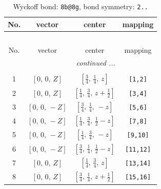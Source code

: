 \documentclass[fleqn,8pt]{jsarticle}
\begin{document}
\renewcommand{\arraystretch}{1.2}
\begin{longtable}{cccc}
\caption{Wyckoff bond: {\tt 8b@8g}, bond symmetry: {\tt 2..}}
 \\
 \hline \hline
No. & vector & center & mapping \\ \hline \endfirsthead

\multicolumn{3}{l}{\tablename\ \thetable{}} \\
 \hline \hline
No. & vector & center & mapping \\ \hline \endhead

 \hline \hline
\multicolumn{3}{r}{\footnotesize\it continued ...} \\ \endfoot

 \hline \hline
\multicolumn{3}{r}{} \\ \endlastfoot

1 & $\left[ 0,\, 0,\, Z \right]$ & $\left[ \frac{3}{4},\, \frac{1}{4},\, z \right]$ & {\tt [1,2]} \\ \hline
2 & $\left[ 0,\, 0,\, Z \right]$ & $\left[ \frac{1}{4},\, \frac{3}{4},\, z + \frac{1}{2} \right]$ & {\tt [3,4]} \\ \hline
3 & $\left[ 0,\, 0,\, - Z \right]$ & $\left[ \frac{3}{4},\, \frac{1}{4},\, - z \right]$ & {\tt [5,6]} \\ \hline
4 & $\left[ 0,\, 0,\, - Z \right]$ & $\left[ \frac{1}{4},\, \frac{3}{4},\, \frac{1}{2} - z \right]$ & {\tt [7,8]} \\ \hline
5 & $\left[ 0,\, 0,\, - Z \right]$ & $\left[ \frac{1}{4},\, \frac{3}{4},\, - z \right]$ & {\tt [9,10]} \\ \hline
6 & $\left[ 0,\, 0,\, - Z \right]$ & $\left[ \frac{3}{4},\, \frac{1}{4},\, \frac{1}{2} - z \right]$ & {\tt [11,12]} \\ \hline
7 & $\left[ 0,\, 0,\, Z \right]$ & $\left[ \frac{1}{4},\, \frac{3}{4},\, z \right]$ & {\tt [13,14]} \\ \hline
8 & $\left[ 0,\, 0,\, Z \right]$ & $\left[ \frac{3}{4},\, \frac{1}{4},\, z + \frac{1}{2} \right]$ & {\tt [15,16]} \\
\end{longtable}
\renewcommand{\arraystretch}{1.2}
\end{document}
